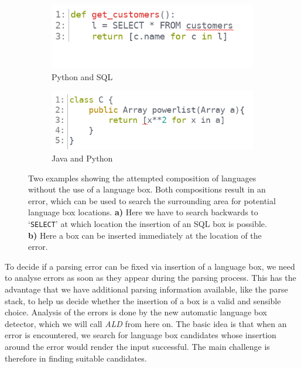 \documentclass[sigplan,screen]{acmart}\settopmatter{printfolios=true,printccs=false,printacmref=false}
\newcommand{\ald}[0]{\emph{ALD}\xspace}
\begin{document}
\begin{figure}
    \begin{subfigure}{0.4\textwidth}
    \includegraphics[width=1\textwidth]{images/heuristic1.png}
    \caption{Python and SQL}
  \end{subfigure}
  \begin{subfigure}{0.4\textwidth}
    \includegraphics[width=1\textwidth]{images/heuristic2.png}
    \caption{Java and Python}
  \end{subfigure}
\caption{Two examples showing the attempted composition of languages without the
use of a language box. Both compositions result in an error, which can be used
to search the surrounding area for potential language box locations. \textbf{a)}
Here we have to search backwards to `\texttt{SELECT}' at which location the
insertion of an SQL box is possible. \textbf{b)} Here a box can be inserted
immediately at the location of the error.}
\label{fig_heuristic_example}
\end{figure}

To decide if a parsing error can be fixed via insertion of a language box, we
need to analyse errors as soon as they appear during the parsing process. This
has the advantage that we have additional parsing information available, like
the parse stack, to help us decide whether the insertion of a box is a valid
and sensible choice. Analysis of the errors is done by the new automatic
language box detector, which we will call \ald from here on. The basic idea is
that when an error is encountered, we search for language box candidates whose
insertion around the error would render the input successful. The main
challenge is therefore in finding suitable candidates.
\end{document}
